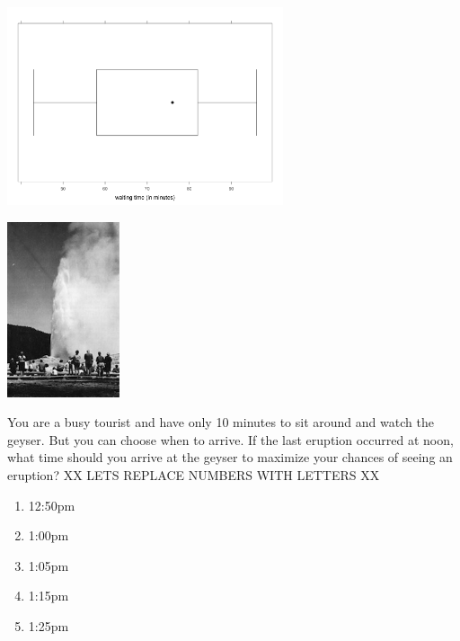 \noindent


\includegraphics[width=3.2in]{includes/faithful1.png}


\hspace*{.10in}\includegraphics[width=1.3in]{includes/old-faithful.jpg}





\noindent


You are a busy tourist and have only 10 minutes to sit around and
watch the geyser. But you can choose when to arrive. If the last
eruption occurred at noon, what time should you arrive at the geyser
to maximize your chances of seeing an eruption?
XX LETS REPLACE NUMBERS WITH LETTERS XX


\begin{enumerate}[leftmargin=1cm, itemsep=.1em]


\item 12:50pm


\item 1:00pm


\item 1:05pm


\item 1:15pm


\item 1:25pm


\end{enumerate}





